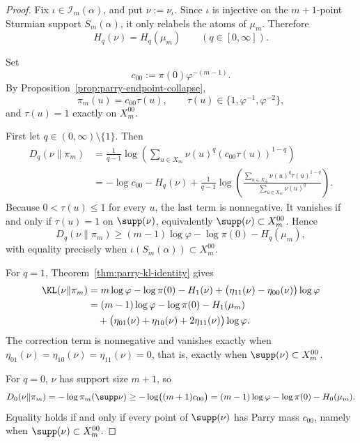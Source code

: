 \begin{proof}
Fix \(\iota\in\mathcal I_m(\alpha)\), and put \(\nu:=\nu_\iota\). Since
\(\iota\) is injective on the \(m+1\)-point Sturmian support \(S_m(\alpha)\),
it only relabels the atoms of \(\mu_m\). Therefore
\[
H_q(\nu)=H_q(\mu_m)
\qquad (q\in[0,\infty]).
\]

Set
\[
c_{00}:=\pi(0)\varphi^{-(m-1)}.
\]
By Proposition~\ref{prop:parry-endpoint-collapse},
\[
\pi_m(u)=c_{00}\tau(u),
\qquad
\tau(u)\in\{1,\varphi^{-1},\varphi^{-2}\},
\]
and \(\tau(u)=1\) exactly on \(X_m^{00}\).

First let \(q\in(0,\infty)\setminus\{1\}\). Then
\[
\begin{aligned}
D_q(\nu\|\pi_m)
&=
\frac{1}{q-1}
\log\!\left(\sum_{u\in X_m}\nu(u)^q(c_{00}\tau(u))^{1-q}\right)\\
&=
-\log c_{00}-H_q(\nu)
+
\frac{1}{q-1}
\log\!\left(
\frac{\sum_{u\in X_m}\nu(u)^q\tau(u)^{1-q}}
{\sum_{u\in X_m}\nu(u)^q}
\right).
\end{aligned}
\]
Because \(0<\tau(u)\le1\) for every \(u\), the last term is nonnegative. It
vanishes if and only if \(\tau(u)=1\) on \(\supp(\nu)\), equivalently
\(\supp(\nu)\subset X_m^{00}\). Hence
\[
D_q(\nu\|\pi_m)
\ge
(m-1)\log\varphi-\log\pi(0)-H_q(\mu_m),
\]
with equality precisely when \(\iota(S_m(\alpha))\subset X_m^{00}\).

For \(q=1\), Theorem~\ref{thm:parry-kl-identity} gives
\[
\begin{aligned}
\KL(\nu\|\pi_m)
&=
m\log\varphi-\log\pi(0)-H_1(\nu)
+
\bigl(\eta_{11}(\nu)-\eta_{00}(\nu)\bigr)\log\varphi\\
&=
(m-1)\log\varphi-\log\pi(0)-H_1(\mu_m)\\
&\quad
+
\bigl(\eta_{01}(\nu)+\eta_{10}(\nu)+2\eta_{11}(\nu)\bigr)\log\varphi.
\end{aligned}
\]
The correction term is nonnegative and vanishes exactly when
\(\eta_{01}(\nu)=\eta_{10}(\nu)=\eta_{11}(\nu)=0\), that is, exactly when
\(\supp(\nu)\subset X_m^{00}\).

For \(q=0\), \(\nu\) has support size \(m+1\), so
\[
D_0(\nu\|\pi_m)
=
-\log\pi_m(\supp\nu)
\ge
-\log\bigl((m+1)c_{00}\bigr)
=
(m-1)\log\varphi-\log\pi(0)-H_0(\mu_m).
\]
Equality holds if and only if every point of \(\supp(\nu)\) has Parry mass
\(c_{00}\), namely when \(\supp(\nu)\subset X_m^{00}\).


\end{proof}
